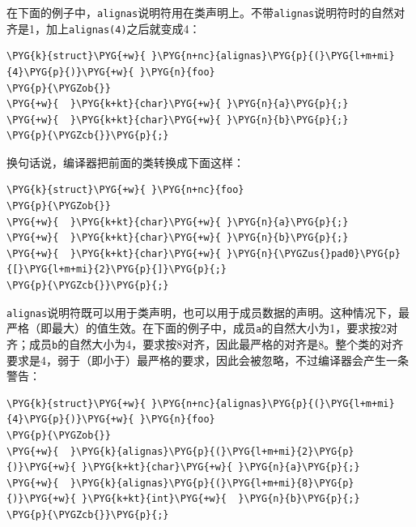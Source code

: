 
在下面的例子中，\texttt{alignas}说明符用在类声明上。不带\texttt{alignas}说明符时的自然对齐是1，加上\texttt{alignas(\allowbreak{}4)}之后就变成4：



\begin{codeblockbg}
\begin{Verbatim}[commandchars=\\\{\},breaklines=true,breakanywhere=true,fontsize=\codefont,xleftmargin=17bp]
\PYG{k}{struct}\PYG{+w}{ }\PYG{n+nc}{alignas}\PYG{p}{(}\PYG{l+m+mi}{4}\PYG{p}{)}\PYG{+w}{ }\PYG{n}{foo}
\PYG{p}{\PYGZob{}}
\PYG{+w}{  }\PYG{k+kt}{char}\PYG{+w}{ }\PYG{n}{a}\PYG{p}{;}
\PYG{+w}{  }\PYG{k+kt}{char}\PYG{+w}{ }\PYG{n}{b}\PYG{p}{;}
\PYG{p}{\PYGZcb{}}\PYG{p}{;}
\end{Verbatim}
\end{codeblockbg}



换句话说，编译器把前面的类转换成下面这样：



\begin{codeblockbg}
\begin{Verbatim}[commandchars=\\\{\},breaklines=true,breakanywhere=true,fontsize=\codefont,xleftmargin=17bp]
\PYG{k}{struct}\PYG{+w}{ }\PYG{n+nc}{foo}
\PYG{p}{\PYGZob{}}
\PYG{+w}{  }\PYG{k+kt}{char}\PYG{+w}{ }\PYG{n}{a}\PYG{p}{;}
\PYG{+w}{  }\PYG{k+kt}{char}\PYG{+w}{ }\PYG{n}{b}\PYG{p}{;}
\PYG{+w}{  }\PYG{k+kt}{char}\PYG{+w}{ }\PYG{n}{\PYGZus{}pad0}\PYG{p}{[}\PYG{l+m+mi}{2}\PYG{p}{]}\PYG{p}{;}
\PYG{p}{\PYGZcb{}}\PYG{p}{;}
\end{Verbatim}
\end{codeblockbg}



\texttt{alignas}说明符既可以用于类声明，也可以用于成员数据的声明。这种情况下，最严格（即最大）的值生效。在下面的例子中，成员\texttt{a}的自然大小为1，要求按2对齐；成员\texttt{b}的自然大小为4，要求按8对齐，因此最严格的对齐是8。整个类的对齐要求是4，弱于（即小于）最严格的要求，因此会被忽略，不过编译器会产生一条警告：



\begin{codeblockbg}
\begin{Verbatim}[commandchars=\\\{\},breaklines=true,breakanywhere=true,fontsize=\codefont,xleftmargin=17bp]
\PYG{k}{struct}\PYG{+w}{ }\PYG{n+nc}{alignas}\PYG{p}{(}\PYG{l+m+mi}{4}\PYG{p}{)}\PYG{+w}{ }\PYG{n}{foo}
\PYG{p}{\PYGZob{}}
\PYG{+w}{  }\PYG{k}{alignas}\PYG{p}{(}\PYG{l+m+mi}{2}\PYG{p}{)}\PYG{+w}{ }\PYG{k+kt}{char}\PYG{+w}{ }\PYG{n}{a}\PYG{p}{;}
\PYG{+w}{  }\PYG{k}{alignas}\PYG{p}{(}\PYG{l+m+mi}{8}\PYG{p}{)}\PYG{+w}{ }\PYG{k+kt}{int}\PYG{+w}{  }\PYG{n}{b}\PYG{p}{;}
\PYG{p}{\PYGZcb{}}\PYG{p}{;}
\end{Verbatim}
\end{codeblockbg}


